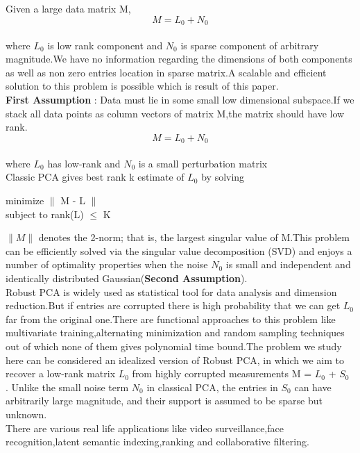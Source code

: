 \documentclass[letterpaper, 10 pt, conference]{ieeeconf}  %
\begin{document}
Given a large data matrix M,
\begin{equation}
M = L_0 + N_0			
\end{equation}
\\
where $L_0$ is low rank component and $N_0$ is sparse component of arbitrary magnitude.We have no information regarding the dimensions of both components as well as non zero entries location in sparse matrix.A scalable and efficient solution to this problem is possible which is result of this paper.
\\ \textbf{First Assumption}  : Data must lie in some small low dimensional subspace.If we stack all data points as column vectors of matrix M,the matrix should have low rank.
\\
\begin{equation}
M = L_0 + N_0			
\end{equation}
\\where $L_0$ has low-rank and $N_0$ is a small perturbation matrix
\\Classic PCA gives best rank k estimate of $L_0$ by solving 
\begin{center}
minimize $\parallel$ M - L $\parallel$
\\subject to rank(L) $\leq$ K
\end{center}
$\parallel M \parallel$ denotes the 2-norm; that is, the largest singular value of M.This problem can be efficiently solved via the singular value decomposition (SVD) and enjoys a number of optimality properties when the noise $N_0$ is small and independent and identically distributed Gaussian(\textbf{Second Assumption}).
\\Robust PCA is widely used as statistical tool for data analysis and dimension reduction.But if entries are corrupted there is high probability that we can get $L_0$ far from the original one.There are functional approaches to this problem like multivariate training,alternating minimization and random sampling techniques out of which none of them gives polynomial time bound.The problem we study here can be considered an idealized version of Robust
PCA, in which we aim to recover a low-rank matrix $L_0$ from highly corrupted measurements M = $L_0$ + $S_0$ . Unlike the small noise term $N_0$ in classical PCA, the entries in $S_0$ can have arbitrarily large magnitude, and their support is assumed to be sparse but unknown.
\\There are various real life applications like video surveillance,face recognition,latent semantic indexing,ranking and collaborative filtering. 
\end{document}
